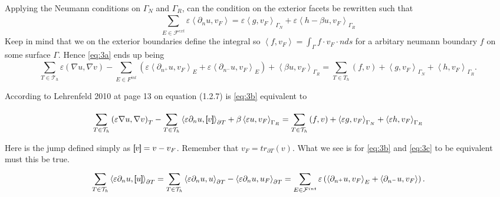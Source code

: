 Applying the Neumann conditions on $ \Gamma _{N} $ and $\Gamma _{R}$, can the condition on the exterior facets
be rewritten such that
\[
\sum_{E \in \mathcal{F} ^{ext}}^{}  \varepsilon \left< \partial _{n} u, v_{F} \right> = \varepsilon \left<g,v_{F}
\right> _{\Gamma _{N}} + \varepsilon \left<h - \beta u, v_{F} \right> _{\Gamma _{R}}
\]
Keep in mind that we on the exterior boundaries define the integral so $\left<f, v_{F} \right> = \int_{\Gamma }^{} f
\cdot v_{F} \cdot n ds $ for a arbitary neumann boundary $f$ on some surface $\Gamma $. Hence \eqref{eq:3a} ends up
being
\begin{equation}
\label{eq:3b}
 \sum_{T \in \mathcal{T}_{h} }^{} \varepsilon \left( \nabla u , \nabla v \right)  - \sum_{E \in F^{int}}^{} \left(
\varepsilon  \left<\partial _{n^{+}} u , v_{F} \right> _{E} + \varepsilon \left<\partial _{n^{-}}  u, v_{F}\right>_{E}
\right) + \left<\beta u, v_{F} \right> _{\Gamma _{R}} = \sum_{T \in T_{h}}^{} \left( f,v \right)   + \left<g, v_{F}
\right>_{\Gamma _{N}} + \left<h, v_{F} \right>_{\Gamma _{R}}
.\end{equation}

According to Lehrenfeld 2010  \cite{lehrenfeld2010} at page 13 on equation (1.2.7)  is \eqref{eq:3b} equivalent to

\begin{equation}
\label{eq:3c}
\sum_{T \in \mathcal{T} _{h}}^{}   \left( \varepsilon \nabla u, \nabla v \right) _{T} -\sum_{T \in \mathcal{T} _{h}}^{}    \left<\varepsilon  \partial
_{n} u , \left[\!\!\left[  v  \right]\!\!\right] \right> _{\partial T}  + \beta  \left< \varepsilon u, v_{F}  \right>_{\Gamma _{R}} = \sum_{T
\in \mathcal{T} _{h}}^{} \left( f,v \right)  + \left<\varepsilon g, v_{F} \right>_{\Gamma _{N}} + \left<\varepsilon h,
v_{F} \right>_{\Gamma _{R}}
\end{equation}


Here is the jump defined simply as $\left[\!\!\left[ v \right]\!\!\right] = v - v_{F}$. Remember that $ v_{F} = tr_{\partial T} \left( v \right)  $. What we see is for \eqref{eq:3b} and \eqref{eq:3c} to be
equivalent must this be true.
\begin{equation}
\label{eq:3c2}
    \sum_{T \in \mathcal{T} _{h}}^{}  \left< \varepsilon \partial _{n} u, \left[\!\!\left[ u \right]\!\!\right]  \right>_{\partial T} = \sum_{T \in
    \mathcal{T} _{h}}^{}  \left< \varepsilon \partial _{n} u, u  \right>_{\partial T} - \left< \varepsilon
    \partial _{n} u, u_{F}  \right>_{\partial T} =\sum_{E \in
    \mathcal{F} ^{int}}^{}  \varepsilon \left( \left< \partial _{n^{+}} u, v_{F} \right>_{E}  + \left<\partial _{n^{-}}
u, v_{F}\right> \right)
.\end{equation}

